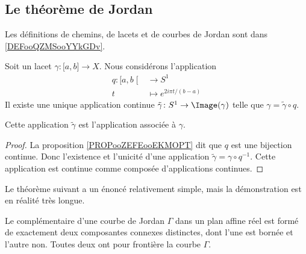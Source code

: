 \subsection{Le théorème de Jordan}

Les définitions de chemins, de lacets et de courbes de Jordan sont dans \ref{DEFooQZMSooYYkGDv}.

\begin{lemmaDef}     \label{LEMooZPRLooJPvrOE}
    Soit un lacet \( \gamma\colon \mathopen[ a , b \mathclose]\to X\). Nous considérons l'application
    \begin{equation}
        \begin{aligned}
            q\colon \mathopen[ a , b \mathclose[&\to S^1 \\
            t&\mapsto  e^{2i\pi t/(b-a)} 
        \end{aligned}
    \end{equation}
    Il existe une unique application continue \( \tilde \gamma\colon S^1\to \Image(\gamma)\) telle que \( \gamma=\tilde \gamma\circ q\).

    Cette application \( \tilde \gamma\) est l'application  associée à \( \gamma\).
\end{lemmaDef}

\begin{proof}
    La proposition \ref{PROPooZEFEooEKMOPT} dit que \( q\) est une bijection continue. Donc l'existence et l'unicité d'une application \( \tilde \gamma=\gamma\circ q^{-1}\). Cette application est continue comme composée d'applications continues.
\end{proof}

Le théorème suivant a un énoncé relativement simple, mais la démonstration est en réalité très longue.
\begin{theorem}\label{ThoHSPWBuh}
	Le complémentaire d'une courbe de Jordan \( \Gamma\) dans un plan affine réel est formé de exactement deux composantes connexes distinctes, dont l'une est bornée et l'autre non. Toutes deux ont pour frontière la courbe \( \Gamma\).
\end{theorem}
